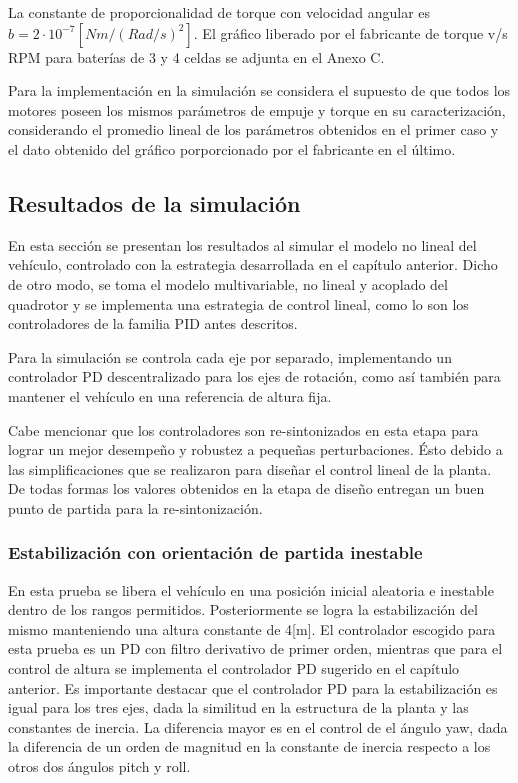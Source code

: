 \documentclass[\main/main.tex]{subfiles}
\begin{document}
La constante de proporcionalidad de torque con velocidad angular es
$b=2\cdot10^{-7}[Nm/(Rad/s)^{2}]$. El gráfico liberado por el fabricante de torque v/s RPM
para baterías de 3 y 4 celdas se adjunta en el Anexo C.

Para la implementación en la simulación se considera el supuesto de
que todos los motores poseen los mismos parámetros de empuje y torque
en su caracterización, considerando el promedio lineal de los parámetros
obtenidos en el primer caso y el dato obtenido del gráfico porporcionado
por el fabricante en el último.

\textcompwordmark{}

\subsection{Resultados de la simulación}

En esta sección se presentan los resultados al simular el modelo no lineal del vehículo, controlado con la estrategia desarrollada
en el capítulo anterior. Dicho de otro modo, se toma el modelo multivariable,
no lineal y acoplado del quadrotor y se implementa una estrategia
de control lineal, como lo son los controladores de la familia PID
antes descritos.

Para la simulación se controla cada eje por separado, implementando
un controlador PD descentralizado para los ejes de rotación, como
así también para mantener el vehículo en una referencia de altura
fija. 

Cabe mencionar que los controladores son re-sintonizados en esta etapa
para lograr un mejor desempeño y robustez a pequeñas perturbaciones.
Ésto debido a las simplificaciones que se realizaron para diseñar
el control lineal de la planta. De todas formas los valores obtenidos
en la etapa de diseño entregan un buen punto de partida para la re-sintonización.

\subsubsection{Estabilización con orientación de partida inestable}

En esta prueba se libera el vehículo en una posición inicial aleatoria
e inestable dentro de los rangos permitidos. Posteriormente se logra
la estabilización del mismo manteniendo una altura constante de 4{[}m{]}.
El controlador escogido para esta prueba es un PD con filtro derivativo
de primer orden, mientras que para el control de altura se implementa
el controlador PD sugerido en el capítulo anterior. Es importante destacar
que el controlador PD para la estabilización es igual para los tres
ejes, dada la similitud en la estructura de la planta y las constantes
de inercia. La diferencia mayor es en el control de el ángulo yaw,
dada la diferencia de un orden de magnitud en la constante de inercia
respecto a los otros dos ángulos pitch y roll.
\end{document}
